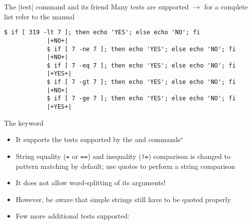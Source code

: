 \begin{frame}[fragile]{The \bash|test| command and its friend \bash{[}}{Many tests are supported $\to$ for a complete list refer to the manual}
\begin{onlyenv}
\begin{lstlisting}[style=MyBash, style=oddnumbers, xleftmargin=8mm, xrightmargin=8mm, aboveskip=2mm]
            $ if [ 319 -lt 7 ]; then echo 'YES'; else echo 'NO'; fi
            |+NO+|
            $ if [ 7 -ne 7 ]; then echo 'YES'; else echo 'NO'; fi
            |+NO+|
            $ if [ 7 -eq 7 ]; then echo 'YES'; else echo 'NO'; fi
            |+YES+|
            $ if [ 7 -gt 7 ]; then echo 'YES'; else echo 'NO'; fi
            |+NO+|
            $ if [ 7 -ge 7 ]; then echo 'YES'; else echo 'NO'; fi
            |+YES+|
        \end{lstlisting}
    \end{onlyenv}
\end{frame}
\begin{frame}[fragile]{The \bash{[[} keyword}
    \vspace{-3mm}
    \begin{itemize}[<only@1>]
        \item It supports the tests supported by the  and \bash{[} commands$^{\star}$
        \item String equality (\texttt{=} or \texttt{==}) and inequality (\texttt{!=}) comparison is changed to \alert{pattern matching} by default; use quotes to perform a string comparison
        \item \alert{It does not allow word-splitting} of its arguments!
        \item However, be aware that simple strings still have to be quoted properly
        \item Few more additional tests supported:

\end{itemize}
\end{frame}
